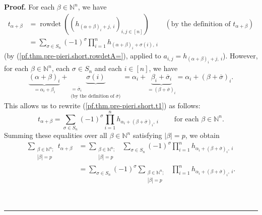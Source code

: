 \documentclass[numbers=enddot,12pt,final,onecolumn,notitlepage,english]{scrartcl}%
\theoremstyle{definition}
\newenvironment{proof}[1][Proof]{\noindent\textbf{#1.} }{\ \rule{0.5em}{0.5em}}
\let\sumnonlimits\sum
\let\prodnonlimits\prod
\renewcommand{\sum}{\sumnonlimits\limits}
\renewcommand{\prod}{\prodnonlimits\limits}
\newenvironment{vershort}{}{}
\begin{document}
\begin{vershort}
\begin{proof}
For each $\beta\in\mathbb{N}^{n}$, we have%
\begin{align}
t_{\alpha+\beta}  &  =\operatorname*{rowdet}\left(  \left(  h_{\left(
\alpha+\beta\right)  _{i}+j,\ i}\right)  _{i,j\in\left[  n\right]  }\right)
\ \ \ \ \ \ \ \ \ \ \left(  \text{by the definition of }t_{\alpha+\beta
}\right) \nonumber\\
&  =\sum_{\sigma\in S_{n}}\left(  -1\right)  ^{\sigma}\prod_{i=1}%
^{n}h_{\left(  \alpha+\beta\right)  _{i}+\sigma\left(  i\right)  ,\ i}
\label{pf.thm.pre-pieri.short.t1}%
\end{align}
(by (\ref{pf.thm.pre-pieri.short.rowdetA=}), applied to $a_{i,j}=h_{\left(
\alpha+\beta\right)  _{i}+j,\ i}$). However, for each $\beta\in\mathbb{N}^{n}%
$, each $\sigma\in S_{n}$ and each $i\in\left[  n\right]  $, we have%
\[
\underbrace{\left(  \alpha+\beta\right)  _{i}}_{=\alpha_{i}+\beta_{i}%
}+\underbrace{\sigma\left(  i\right)  }_{\substack{=\overline{\sigma}%
_{i}\\\text{(by the definition of }\overline{\sigma}\text{)}}}=\alpha
_{i}+\underbrace{\beta_{i}+\overline{\sigma}_{i}}_{=\left(  \beta
+\overline{\sigma}\right)  _{i}}=\alpha_{i}+\left(  \beta+\overline{\sigma
}\right)  _{i}.
\]
This allows us to rewrite (\ref{pf.thm.pre-pieri.short.t1}) as follows:%
\[
t_{\alpha+\beta}=\sum_{\sigma\in S_{n}}\left(  -1\right)  ^{\sigma}\prod
_{i=1}^{n}h_{\alpha_{i}+\left(  \beta+\overline{\sigma}\right)  _{i}%
,\ i}\ \ \ \ \ \ \ \ \ \ \text{for each }\beta\in\mathbb{N}^{n}.
\]
Summing these equalities over all $\beta\in\mathbb{N}^{n}$ satisfying
$\left\vert \beta\right\vert =p$, we obtain%
\begin{align}
\sum_{\substack{\beta\in\mathbb{N}^{n};\\\left\vert \beta\right\vert
=p}}t_{\alpha+\beta}  &  =\sum_{\substack{\beta\in\mathbb{N}^{n};\\\left\vert
\beta\right\vert =p}}\ \ \sum_{\sigma\in S_{n}}\left(  -1\right)  ^{\sigma
}\prod_{i=1}^{n}h_{\alpha_{i}+\left(  \beta+\overline{\sigma}\right)
_{i},\ i}\nonumber\\
&  =\sum_{\sigma\in S_{n}}\left(  -1\right)  ^{\sigma}\sum_{\substack{\beta
\in\mathbb{N}^{n};\\\left\vert \beta\right\vert =p}}\ \ \prod_{i=1}%
^{n}h_{\alpha_{i}+\left(  \beta+\overline{\sigma}\right)  _{i},\ i}.
\label{pf.thm.pre-pieri.short.sumt=1}%
\end{align}



\end{proof}
\end{vershort}
\end{document}

